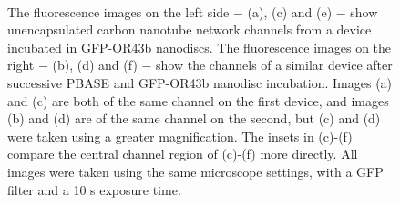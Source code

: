 \documentclass[
  a4paper,
]{scrbook}
\begin{document}
\begin{figure}
\begin{minipage}[t]{0.47\linewidth}
{{}

}

\subcaption{\label{fig-GFP-OR-ch3}}
\end{minipage}%
%
\begin{minipage}[t]{0.05\linewidth}

{\centering 

~

}

\end{minipage}%
%
\begin{minipage}[t]{0.47\linewidth}

{\centering 


}

\subcaption{\label{fig-PBASE-GFP-OR-ch2}}
\end{minipage}%

\caption{\label{fig-PBASE-GFP-ORs}The fluorescence images on the left
side \(-\) (a), (c) and (e) \(-\) show unencapsulated carbon nanotube
network channels from a device incubated in GFP-OR43b nanodiscs. The
fluorescence images on the right \(-\) (b), (d) and (f) \(-\) show the
channels of a similar device after successive PBASE and GFP-OR43b
nanodisc incubation. Images (a) and (c) are both of the same channel on
the first device, and images (b) and (d) are of the same channel on the
second, but (c) and (d) were taken using a greater magnification. The
insets in (c)-(f) compare the central channel region of (c)-(f) more
directly. All images were taken using the same microscope settings, with
a GFP filter and a 10 s exposure time.}

\end{figure}
\end{document}
